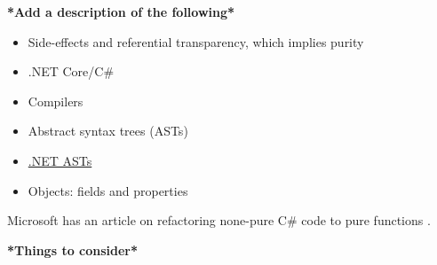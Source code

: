 \documentclass[a4paper,12pt]{article}
\begin{document}
\noindent\makebox[\linewidth]{\rule{\textwidth}{0.4pt}} %

\textbf{*Add a description of the following*}
\begin{itemize}
  \item Side-effects and referential transparency, which implies purity~\cite{purity-in-javascript}
  \item .NET Core/C\#
  \item Compilers
  \item Abstract syntax trees (ASTs)
  \item \href{https://docs.microsoft.com/en-us/dotnet/csharp/roslyn-sdk/work-with-syntax}{.NET ASTs}~\cite{albahari2003nutshell}
  \item Objects: fields and properties %
\end{itemize}

Microsoft has an article on refactoring none-pure C\# code to pure functions \cite{microsoft-refactoring}.

\textbf{*Things to consider*}
\end{document}
